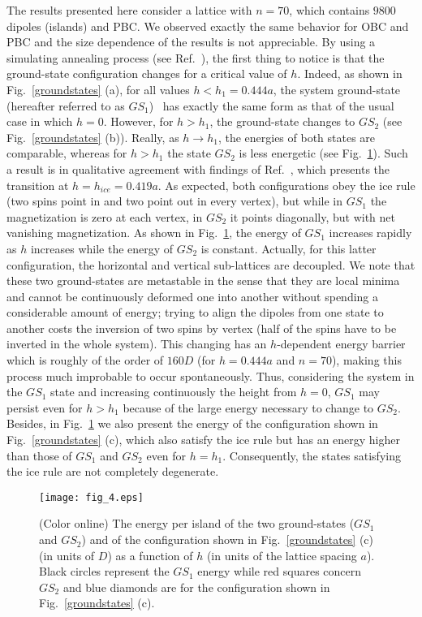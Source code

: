 \documentclass[aps,prb,twocolumn,floatfix,showpacs,amsmath,amssymb]{revtex4}
\begin{document}
The results presented here consider a lattice with $n=70$, which
contains $9800$ dipoles (islands) and PBC. We observed exactly the
same behavior for OBC and PBC and the size dependence of the
results is not appreciable. By using a simulating annealing
process (see Ref.~), the first thing to notice
is that the ground-state configuration changes for a critical
value of $h$. Indeed, as shown in
Fig.~\ref{groundstates} (a), for all values $h<h_1=0.444a$, the system
ground-state (hereafter referred to as $GS_1$)  has exactly the
same form as that of the usual case in which $h=0$. However, for
$h>h_1$, the ground-state changes to $GS_2$ (see
Fig.~\ref{groundstates} (b)). Really, as $h \to h_1$,
the energies of both states are comparable, whereas for $h>h_1$
the state $GS_2$ is less energetic (see
Fig.~\ref{groundstatesenergy}). Such a result is in qualitative
agreement with findings of Ref.~, which
presents the transition at $h=h_{ice} = 0.419a$. As expected, both
configurations obey the ice rule (two spins point in and two point
out in every vertex), but while in $GS_{1}$ the magnetization is
zero at each vertex, in $GS_{2}$ it points diagonally, but with
net vanishing magnetization. As shown in
Fig.~\ref{groundstatesenergy}, the energy of $GS_1$ increases
rapidly as $h$ increases while the energy of $GS_2$ is constant.
Actually, for this latter configuration, the horizontal and
vertical sub-lattices are decoupled. We note that these two
ground-states are metastable in the sense that they are local
minima and cannot be continuously deformed one into another
without spending a considerable amount of energy; trying to align
the dipoles from one state to another costs the inversion of two
spins by vertex (half of the spins have to be inverted in the
whole system). This changing has an $h$-dependent energy barrier
which is roughly of the order of $160D$ (for $h=0.444a$ and
$n=70$), making this process much improbable to occur
spontaneously. Thus, considering the system in the $GS_1$ state
and increasing continuously the height from $h=0$, $GS_1$ may
persist even for $h>h_{1}$ because of the large energy necessary
to change to $GS_2$. Besides, in Fig.~\ref{groundstatesenergy} we also
present the energy of the configuration shown in Fig.~\ref{groundstates} (c),
which also satisfy the ice rule but has an energy higher than those of $GS_1$
and $GS_2$ even for $h=h_1$. Consequently, the states satisfying the ice rule
are not completely degenerate.

\begin{figure}
\texttt{[image: fig\_4.eps]}
\caption{\label{groundstatesenergy} (Color online) The energy per island of
the two ground-states ($GS_1$ and $GS_2$) and of the configuration
shown in Fig.~\ref{groundstates} (c) (in units of $D$) as a function of $h$ (in units
of the lattice spacing $a$).
Black circles represent the $GS_{1}$ energy while red squares
concern $GS_{2}$ and blue diamonds are for the configuration shown in Fig.~\ref{groundstates} (c).}
\end{figure}
\end{document}
